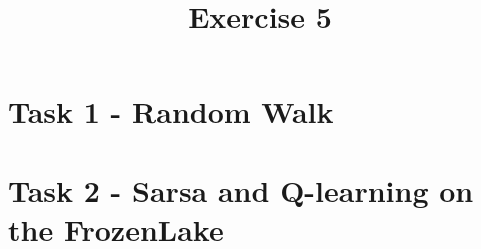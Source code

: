 \documentclass[a4paper]{article}
\date{}
\author{}
\title{\textbf{Exercise 5}}
\begin{document}
\maketitle 
\thispagestyle{fancy}

\section*{Task 1 - Random Walk}


\section*{Task 2 - Sarsa and Q-learning on the FrozenLake}
\end{document}
